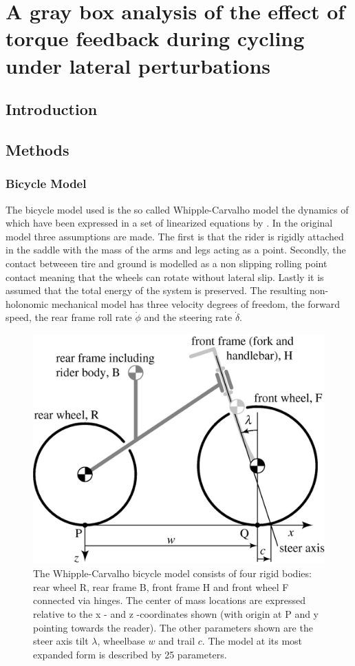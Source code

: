 \chapter{A gray box analysis of the effect of torque feedback during cycling under lateral perturbations} \label{hapticFB}

\section{Introduction}
\section{Methods}

\subsection{Bicycle Model}
The bicycle model used is the so called Whipple-Carvalho model the dynamics of which have been expressed in a set of linearized equations by \citet{meijaard2007linearized}. In the original model three assumptions are made. The first is that the rider is rigidly attached in the saddle with the mass of the arms and legs acting as a point. Secondly, the contact betweeen tire and ground is modelled as a non slipping rolling point contact meaning that the wheels can rotate without lateral slip. Lastly it is assumed that the total energy of the system is preserved. The resulting non-holonomic mechanical model has three velocity degrees of freedom, the forward speed, the rear frame roll rate \ensuremath{\dot{\phi}} and the steering rate \ensuremath{\dot{\delta}}.
\begin{figure}[ht]
    \centering
    \includegraphics[scale=0.3]{images/figure3_1.png}
    \caption{ The Whipple-Carvalho bicycle model consists of four rigid bodies: rear wheel R, rear frame B, front frame H and front wheel F connected via hinges. The center of mass locations are expressed relative to the x - and z -coordinates shown (with origin at P and y pointing towards the reader). The other parameters shown are the steer axis tilt \ensuremath{\lambda}, wheelbase \ensuremath{w} and trail \ensuremath{c}. The model at its most expanded form is described by 25 parameters.\cite{meijaard2007linearized}}
    \label{fig:figure2}
\end{figure}
